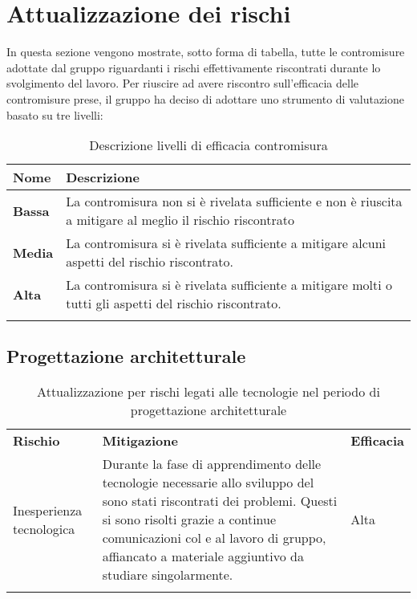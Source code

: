 \appendix

\section{Attualizzazione dei rischi}

In questa sezione vengono mostrate, sotto forma di tabella, tutte le contromisure adottate dal gruppo \gruppo{} riguardanti i rischi effettivamente riscontrati durante lo svolgimento del lavoro.  Per riuscire ad avere riscontro sull'efficacia delle contromisure prese, il gruppo ha deciso di adottare uno strumento di valutazione basato su tre livelli:

\setlength{\freewidth}{\dimexpr\textwidth-0\tabcolsep}
	\renewcommand{\arraystretch}{1.5}
	\setlength{\aboverulesep}{0pt}
	\setlength{\belowrulesep}{0pt}
	\begin{longtable}{L{.210\freewidth} L{.6\freewidth} }
		\toprule 
		\textbf{Nome} & \textbf{Descrizione} \\
		\hline
		\textbf{Bassa} & La contromisura non si è rivelata sufficiente e non è riuscita a mitigare al meglio il rischio riscontrato \\
		\textbf{Media} & La contromisura si è rivelata sufficiente a mitigare alcuni aspetti del rischio riscontrato. \\
		\textbf{Alta} & La contromisura si è rivelata sufficiente a mitigare molti o tutti gli aspetti del rischio riscontrato.\\
		\endhead		
		\hiderowcolors
		\caption{Descrizione livelli di efficacia contromisura }
	\end{longtable}

\subsection{Progettazione architetturale}

\setlength{\freewidth}{\dimexpr\textwidth-0\tabcolsep}
	\renewcommand{\arraystretch}{1.5}
	\setlength{\aboverulesep}{0pt}
	\setlength{\belowrulesep}{0pt}
	\begin{longtable}{L{.210\freewidth} L{.6\freewidth} L{.1\freewidth}}
		\toprule 
		\\
		\toprule
		\textbf{Rischio} & \textbf{Mitigazione} & \textbf{Efficacia} \\
		\hline
		Inesperienza tecnologica & Durante la fase di apprendimento delle tecnologie necessarie allo sviluppo del  sono stati riscontrati dei problemi. Questi si sono risolti grazie a continue comunicazioni col  e al lavoro di gruppo, affiancato a materiale aggiuntivo da studiare singolarmente. & Alta\\
		\endhead		
		\hiderowcolors
		\caption{Attualizzazione per rischi legati alle tecnologie nel periodo di progettazione architetturale }
	\end{longtable}
	


